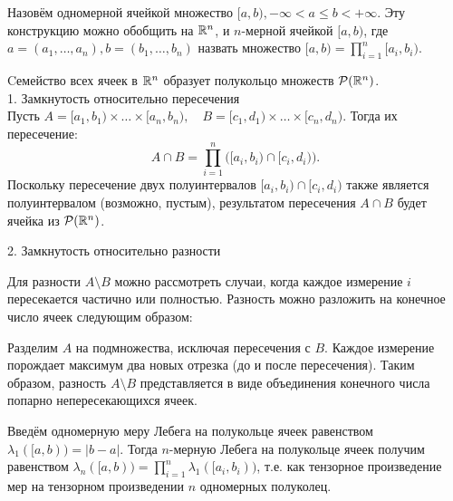 \begin{definition}
Назовём одномерной ячейкой множество $[a, b), -\infty < a \leq b < +\infty$.   Эту конструкцию можно обобщить на $\mathbb{R}^n$, и $n$-мерной ячейкой $[a, b)$, где $a = (a_1, \ldots, a_n), b = (b_1, \ldots, b_n)$ назвать множество $[a, b) = \prod\limits_{i = 1}^n [a_i, b_i)$. 
\end{definition}
\begin{exercise}
Cемейство всех ячеек в $\mathbb{R}^n$ образует полукольцо множеств $\mathcal{P}(\mathbb{R}^n)$. \\
1. Замкнутость относительно пересечения \\
Пусть $
A = [a_1, b_1) \times \dots \times [a_n, b_n), \quad B = [c_1, d_1) \times \dots \times [c_n, d_n).
$
Тогда их пересечение:
\[
A \cap B = \prod_{i=1}^n \big([a_i, b_i) \cap [c_i, d_i)\big).
\]
Поскольку пересечение двух полуинтервалов \( [a_i, b_i) \cap [c_i, d_i) \) также является полуинтервалом (возможно, пустым), результатом пересечения \( A \cap B \) будет ячейка из $\mathcal{P}(\mathbb{R}^n)$.

2. Замкнутость относительно разности

Для разности \( A \setminus B \) можно рассмотреть случаи, когда каждое измерение \( i \) пересекается частично или полностью. Разность можно разложить на конечное число ячеек следующим образом:

Разделим \( A \) на подмножества, исключая пересечения с \( B \). Каждое измерение порождает максимум два новых отрезка (до и после пересечения). Таким образом, разность \( A \setminus B \) представляется в виде объединения конечного числа попарно непересекающихся ячеек.
\end{exercise}

\begin{definition}
    Введём одномерную меру Лебега на полукольце ячеек равенством $\lambda_1([a, b)) = |b - a|$. Тогда $n$-мерную Лебега на полукольце ячеек получим равенством $\lambda_n([a, b)) = \prod\limits_{i = 1}^n \lambda_1([a_i, b_i))$, т.е. как тензорное произведение мер на тензорном произведении $n$ одномерных полуколец.
\end{definition}

